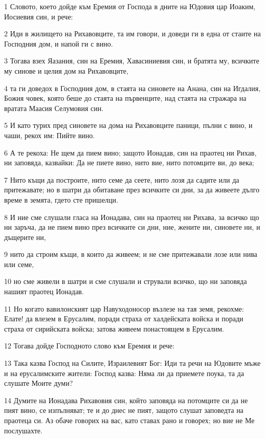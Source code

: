\par 1 Словото, което дойде към Еремия от Господа в дните на Юдовия цар Иоаким, Иосиевия син, и рече:
\par 2 Иди в жилището на Рихавовците, та им говори, и доведи ги в една от стаите на Господния дом, и напой ги с вино.
\par 3 Тогава взех Яазания, син на Еремия, Хавасиниевия син, и братята му, всичките му синове и целия дом на Рихавовците,
\par 4 та ги доведох в Господния дом, в стаята на синовете на Анана, син на Игдалия, Божия човек, която беше до стаята на първенците, над стаята на стражара на вратата Маасия Селумовия син.
\par 5 И като турих пред синовете на дома на Рихавовците паници, пълни с вино, и чаши, рекох им: Пийте вино.
\par 6 А те рекоха: Не щем да пием вино; защото Ионадав, син на праотец ни Рихав, ни заповяда, казвайки: Да не пиете вино, нито вие, нито потомците ви, до века;
\par 7 Нито къщи да построите, нито семе да сеете, нито лозя да садите или да притежавате; но в шатри да обитаване през всичките си дни, за да живеете дълго време в земята, гдето сте пришелци.
\par 8 И ние сме слушали гласа на Ионадава, син на праотец ни Рихава, за всичко що ни заръча, да не пием вино през всичките си дни, ние, жените ни, синовете ни, и дъщерите ни,
\par 9 нито да строим къщи, в които да живеем; и не сме притежавали лозе или нива или семе,
\par 10 но сме живели в шатри и сме слушали и стрували всичко, що ни заповяда нашият праотец Ионадав.
\par 11 Но когато вавилонският цар Навуходоносор възлезе на тая земя, рекохме: Елате! да влезем в Ерусалим, поради страха от халдейската войска и поради страха от сирийската войска; затова живеем понастоящем в Ерусалим.
\par 12 Тогава дойде Господното слово към Еремия и рече:
\par 13 Така казва Господ на Силите, Израилевият Бог: Иди та речи на Юдовите мъже и на ерусалимските жители: Господ казва: Няма ли да приемете поука, та да слушате Моите думи?
\par 14 Думите на Ионадава Рихавовия син, който заповяда на потомците си да не пият вино, се изпълняват; те и до днес не пият, защото слушат заповедта на праотеца си. Аз обаче говорих на вас, като ставах рано и говорех; но вие не Ме послушахте.
